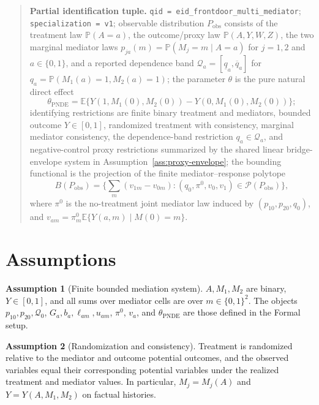 \documentclass[11pt]{article}
\newcommand{\E}{\mathbb{E}}
\renewcommand{\Pr}{\mathbb{P}}
\theoremstyle{definition}
\newtheorem{assumption}{Assumption}
\theoremstyle{plain}
\theoremstyle{remark}
\begin{document}
\begin{quote}
\textbf{Partial identification tuple.}
\texttt{qid = eid\_frontdoor\_multi\_mediator};
\texttt{specialization = v1};
observable distribution \(P_{\mathrm{obs}}\) consists of the treatment law
\(\Pr(A=a)\), the outcome/proxy law \(\Pr(A,Y,W,Z)\), the two marginal
mediator laws \(p_{ja}(m)=\Pr(M_j=m\mid A=a)\) for \(j=1,2\) and
\(a\in\{0,1\}\), and a reported dependence band
\(\mathcal Q_a=[\underline q_a,\overline q_a]\) for
\(q_a=\Pr(M_1(a)=1,M_2(a)=1)\);
the parameter \(\theta\) is the pure natural direct effect
\[
  \theta_{\mathrm{PNDE}}
  = \E\{Y(1,M_1(0),M_2(0))-Y(0,M_1(0),M_2(0))\};
\]
identifying restrictions are finite binary treatment and mediators, bounded
outcome \(Y\in[0,1]\), randomized treatment with consistency, marginal
mediator consistency, the dependence-band restriction \(q_a\in\mathcal Q_a\),
and negative-control proxy restrictions summarized by the shared linear
bridge-envelope system in Assumption~\ref{ass:proxy-envelope};
the bounding functional is the projection of the finite mediator--response
polytope
\[
  B(P_{\mathrm{obs}})
  = \{\sum_m(v_{1m}-v_{0m}) :
       (q_0,\pi^0,v_0,v_1)\in\mathcal P(P_{\mathrm{obs}})\},
\]
where \(\pi^0\) is the no-treatment joint mediator law induced by
\((p_{10},p_{20},q_0)\), and \(v_{am}=\pi^0_m\E\{Y(a,m)\mid M(0)=m\}\).
\end{quote}

\section{Assumptions}
\begin{assumption}[Finite bounded mediation system]\label{ass:finite}
\(A,M_1,M_2\) are binary, \(Y\in[0,1]\), and all sums over mediator cells are
over \(m\in\{0,1\}^2\).  The objects \(p_{10},p_{20},\mathcal Q_0\),
\(G_a,b_a,\ell_{am},u_{am}\), \(\pi^0\), \(v_a\), and
\(\theta_{\mathrm{PNDE}}\) are those defined in the Formal setup.
\end{assumption}

\begin{assumption}[Randomization and consistency]\label{ass:rand-consistency}
Treatment is randomized relative to the mediator and outcome potential
outcomes, and the observed variables equal their corresponding potential
variables under the realized treatment and mediator values.  In particular,
\(M_j=M_j(A)\) and \(Y=Y(A,M_1,M_2)\) on factual histories.
\end{assumption}
\end{document}
